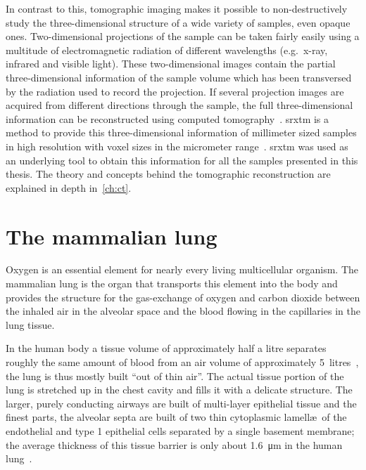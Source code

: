 In contrast to this, tomographic imaging makes it possible to non-destructively study the three-dimensional structure of a wide variety of samples, even opaque ones. Two-dimensional projections of the sample can be taken fairly easily using a multitude of electromagnetic radiation of different wavelengths (e.g.\ x-ray, infrared and visible light). These two-dimensional images contain the partial three-dimensional information of the sample volume which has been transversed by the radiation used to record the projection. If several projection images are acquired from different directions through the sample, the full three-dimensional information can be reconstructed using computed tomography~\cite{Hounsfield1976a}. \acf{srxtm} is a method to provide this three-dimensional information of millimeter sized samples in high resolution with voxel sizes in the micrometer range~\cite{Bonse2008}. \ac{srxtm} was used as an underlying tool to obtain this information for all the samples presented in this thesis. The theory and concepts behind the tomographic reconstruction are explained in depth in~\autoref{ch:ct}.

\section{The mammalian lung}
Oxygen is an essential element for nearly every living multicellular organism. The mammalian lung is the organ that transports this element into the body and provides the structure for the gas-exchange of oxygen and carbon dioxide between the inhaled air in the alveolar space and the blood flowing in the capillaries in the lung tissue.

In the human body a tissue volume of approximately half a litre separates roughly the same amount of blood from an air volume of approximately 5~litres~\cite{Weibel2009}, the lung is thus mostly built ``out of thin air''. The actual tissue portion of the lung is stretched up in the chest cavity and fills it with a delicate structure. The larger, purely conducting airways are built of multi-layer epithelial tissue and the finest parts, the alveolar septa are built of two thin cytoplasmic lamell\ae\ of the endothelial and type 1 epithelial cells separated by a single basement membrane; the average thickness of this tissue barrier is only about \SI{1.6}{\micro\meter} in the human lung~\cite{Weibel2009}.

